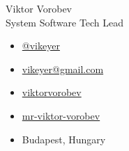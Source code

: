 \begin{minipage}[b]{0.78\linewidth}
	{\fontsize{28pt}{28pt}\selectfont Viktor Vorobev}
	\\[1em]
	{\color{gray}\fontsize{16pt}{16pt}\selectfont System Software Tech Lead}
\end{minipage}
\hfill%
\begin{minipage}[b]{0.24\linewidth}
	\begin{flushleft}
		\begin{itemize}
			\item[\color{cyan}\faPaperPlane] \href{https://t.me/vikeyer}{@vikeyer}
			\item[\color{cyan}\faEnvelope] \href{mailto:vikeyer@gmail.com}{vikeyer@gmail.com}
			\item[\color{cyan}\faGithub] \href{https://github.com/viktorvorobev}{viktorvorobev}
			\item[\color{cyan}\faLinkedin] \href{https://www.linkedin.com/in/mr-viktor-vorobev/}{mr-viktor-vorobev}
			\item[\faBuildingO] Budapest, Hungary
		\end{itemize}
	\end{flushleft}
\end{minipage}
\vspace{3mm}

